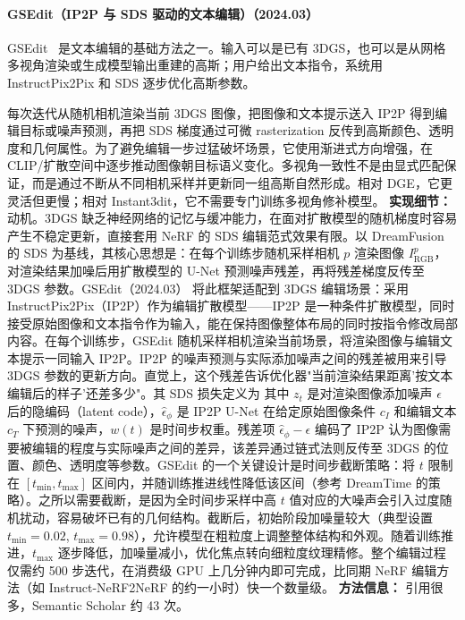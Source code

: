 \paragraph{GSEdit（IP2P 与 SDS 驱动的文本编辑）（2024.03）}
GSEdit~\cite{2403_05154} 是文本编辑的基础方法之一。输入可以是已有 3DGS，也可以是从网格多视角渲染或生成模型输出重建的高斯；用户给出文本指令，系统用 InstructPix2Pix 和 SDS 逐步优化高斯参数。

每次迭代从随机相机渲染当前 3DGS 图像，把图像和文本提示送入 IP2P 得到编辑目标或噪声预测，再把 SDS 梯度通过可微 rasterization 反传到高斯颜色、透明度和几何属性。为了避免编辑一步过猛破坏场景，它使用渐进式方向增强，在 CLIP/扩散空间中逐步推动图像朝目标语义变化。多视角一致性不是由显式匹配保证，而是通过不断从不同相机采样并更新同一组高斯自然形成。相对 DGE，它更灵活但更慢；相对 Instant3dit，它不需要专门训练多视角修补模型。
\textbf{实现细节：} 动机。3DGS 缺乏神经网络的记忆与缓冲能力，在面对扩散模型的随机梯度时容易产生不稳定更新，直接套用 NeRF 的 SDS 编辑范式效果有限。以 DreamFusion 的 SDS 为基线，其核心思想是：在每个训练步随机采样相机 $p$ 渲染图像 $I^p_{\mathrm{RGB}}$，对渲染结果加噪后用扩散模型的 U-Net 预测噪声残差，再将残差梯度反传至 3DGS 参数。GSEdit（2024.03） 将此框架适配到 3DGS 编辑场景：采用 InstructPix2Pix（IP2P）作为编辑扩散模型——IP2P 是一种条件扩散模型，同时接受原始图像和文本指令作为输入，能在保持图像整体布局的同时按指令修改局部内容。在每个训练步，GSEdit 随机采样相机渲染当前场景，将渲染图像与编辑文本提示一同输入 IP2P。IP2P 的噪声预测与实际添加噪声之间的残差被用来引导 3DGS 参数的更新方向。直觉上，这个残差告诉优化器"当前渲染结果距离'按文本编辑后的样子'还差多少"。其 SDS 损失定义为 其中 $z_t$ 是对渲染图像添加噪声 $\epsilon$ 后的隐编码（latent code），$\hat{\epsilon}_\phi$ 是 IP2P U-Net 在给定原始图像条件 $c_I$ 和编辑文本 $c_T$ 下预测的噪声，$w(t)$ 是时间步权重。残差项 $\hat{\epsilon}_\phi - \epsilon$ 编码了 IP2P 认为图像需要被编辑的程度与实际噪声之间的差异，该差异通过链式法则反传至 3DGS 的位置、颜色、透明度等参数。GSEdit 的一个关键设计是时间步截断策略：将 $t$ 限制在 $[t_{\min}, t_{\max}]$ 区间内，并随训练推进线性降低该区间（参考 DreamTime 的策略）。之所以需要截断，是因为全时间步采样中高 $t$ 值对应的大噪声会引入过度随机扰动，容易破坏已有的几何结构。截断后，初始阶段加噪量较大（典型设置 $t_{\min}=0.02$, $t_{\max}=0.98$），允许模型在粗粒度上调整整体结构和外观。随着训练推进，$t_{\max}$ 逐步降低，加噪量减小，优化焦点转向细粒度纹理精修。整个编辑过程仅需约 500 步迭代，在消费级 GPU 上几分钟内即可完成，比同期 NeRF 编辑方法（如 Instruct-NeRF2NeRF 的约一小时）快一个数量级。
\textbf{方法信息：} 引用很多，Semantic Scholar 约 43 次。
